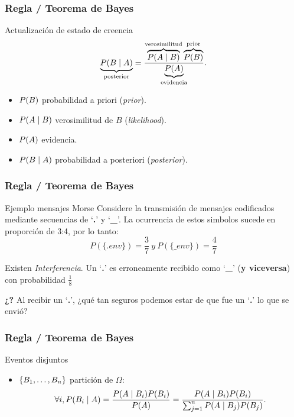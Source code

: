 \documentclass[table]{beamer}
\begin{document}
\begin{frame}
    \frametitle{Regla / Teorema de Bayes}
    \begin{block}{Actualización de estado de creencia}
        \begin{equation*}
            \underbrace{\prob{B \mid A}}_{\text{posterior}} = \frac{\overbrace{\prob{A \mid B}}^{\text{verosimilitud}} \overbrace{\prob{B}}^{\text{prior}}}{\underbrace{\prob{A}}_{\text{evidencia}}} .
        \end{equation*}
        \begin{itemize}
            \item $\prob{B}$ probabilidad a priori (\emph{prior}).
            \item $\prob{A \mid B}$ verosimilitud de $B$ (\emph{likelihood}).
            \item $\prob{A}$ evidencia.
            \item $\prob{B \mid A}$ probabilidad a posteriori (\emph{posterior}).
        \end{itemize}
    \end{block}

\end{frame}




\begin{frame}
    \frametitle{Regla / Teorema de Bayes}
    \begin{block}{Ejemplo mensajes Morse}
		Considere la transmisión de mensajes codificados mediante secuencias de `\textbf{.}' y `\textbf{\_}'. La ocurrencia de estos simbolos sucede en proporción de 3:4, por lo tanto:
$$P(\{. env\})=\frac{3}{7}\ y\ P(\{\_ env\})=\frac{4}{7} $$

Existen \textit{Interferencia}. Un `\textbf{.}' es erroneamente recibido como `\textbf{\_}' (\textbf{y viceversa}) con probabilidad $\frac{1}{8}$


\textbf{¿?} Al recibir un `\textbf{.}', ¿qué tan seguros podemos estar de que fue un `\textbf{.}' lo que se envió?
    \end{block}
\end{frame}

\begin{frame}

\end{frame}


\begin{frame}
\frametitle{Regla / Teorema de Bayes}

\begin{block}{Eventos disjuntos}
        \begin{itemize}
            \item $\bparens{B_{1}, \ldots, B_{n}}$ partición de $\Omega$:
                \begin{equation*}
                    \forall i, \prob{B_{i} \mid A} = \frac{\prob{A \mid B_{i}} \prob{B_{i}}}{\prob{A}}
                    =
                    \frac{\prob{A \mid B_{i}} \prob{B_{i}}}{\sum_{j = 1}^{n} \prob{A \mid B_{j}} \prob{B_{j}}} .
                \end{equation*}
        \end{itemize}
    \end{block}
\end{frame}
\end{document}
